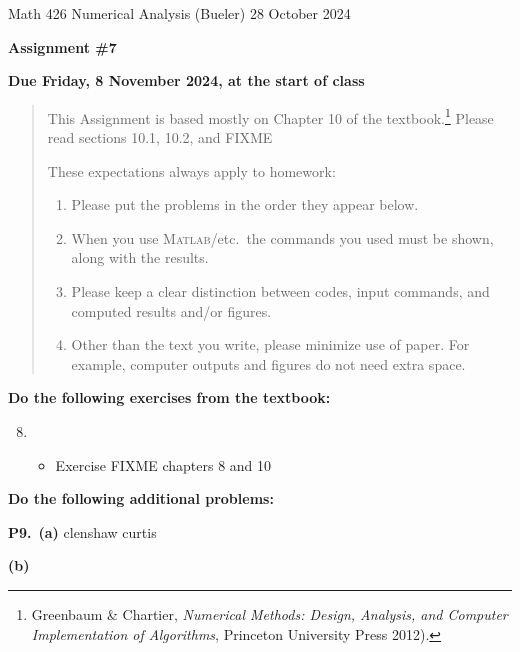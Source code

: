 \documentclass[12pt]{amsart}
\newcommand{\Matlab}{\textsc{Matlab}\xspace}
\newcommand{\prob}[1]{\bigskip\noindent\textbf{#1.}\quad }
\newcommand{\epart}[1]{\medskip\noindent\textbf{(#1)}\quad }
\newcommand{\ppart}[1]{\,\textbf{(#1)}\quad }
\begin{document}
\scriptsize \noindent Math 426 Numerical Analysis (Bueler) \hfill 28 October 2024
\normalsize

\medskip\bigskip

\Large\centerline{\textbf{Assignment \#7}}
\large
\bigskip

\centerline{\textbf{Due Friday, 8 November 2024, at the start of class}}
\medskip
\normalsize

\thispagestyle{empty}

\begin{quote}
{\small
This Assignment is based mostly on Chapter 10 of the textbook.\footnote{Greenbaum \& Chartier, \emph{Numerical Methods: Design, Analysis, and Computer Implementation of Algorithms}, Princeton University Press 2012).}  Please read sections 10.1, 10.2, and FIXME

\medskip
\noindent These expectations always apply to homework:
\renewcommand{\labelenumi}{\arabic{enumi}.\,}
\begin{enumerate}
\item Please put the problems in the order they appear below.
\item When you use \Matlab/etc.~the commands you used must be shown, along with the results.
\item Please keep a clear distinction between codes, input commands, and computed results and/or figures.
\item Other than the text you write, please minimize use of paper.  For example, computer outputs and figures do not need extra space.
\end{enumerate}
}
\end{quote}

\bigskip
\noindent \textbf{Do the following exercises from the textbook:}

\medskip
\renewcommand{\labelenumi}{{\footnotesize\underline{\textsc{Chapter \arabic{enumi}}}}}
\begin{enumerate}
\setcounter{enumi}{7}
\item ~
    \begin{itemize}
    \item Exercise FIXME chapters 8 and 10
    \end{itemize}
\end{enumerate}

\bigskip
\noindent \textbf{Do the following additional problems:}

\prob{P9}  \ppart{a} clenshaw curtis

\epart{b}  
\end{document}
